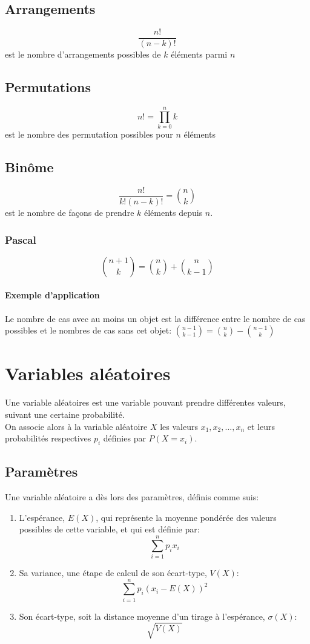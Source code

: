 \documentclass{article}
\begin{document}
\subsection{Arrangements}
$$\frac{n!}{(n-k)!}$$ est le nombre d'arrangements possibles de $k$ éléments parmi $n$

\subsection{Permutations}
$$n!=\prod_{k=0}^nk$$ est le nombre des permutation possibles pour $n$ éléments

\subsection{Binôme}
$$\frac{n!}{k!(n - k)!} = \binom{n}{k}$$ est le nombre de façons de prendre $k$ éléments depuis $n$.
\subsubsection{Pascal}
$$\binom{n+1}{k} = \binom{n}{k} + \binom{n}{k-1}$$
\break
\paragraph{Exemple d'application}
Le nombre de cas avec au moins un objet est la différence entre le nombre de cas possibles et le nombres de cas sans cet objet: $\binom{n-1}{k-1} = \binom{n}{k} - \binom{n-1}{k}$



\section{Variables aléatoires}

Une variable aléatoires est une variable pouvant prendre différentes valeurs, suivant une certaine probabilité. \\
On associe alors à la variable aléatoire $X$ les valeurs $x_1, x_2, ..., x_n$ et leurs probabilités respectives $p_i$ définies par $P(X = x_i)$.


\subsection{Paramètres}
Une variable aléatoire a dès lors des paramètres, définis comme suis:
\begin{enumerate}
	\item L'espérance, $E(X)$, qui représente la moyenne pondérée des valeurs possibles de cette variable, et qui est définie par: $$\sum^n_{i=1}p_ix_i$$
	\item Sa variance, une étape de calcul de son écart-type, $V(X)$: $$\sum^n_{i=1}p_i(x_i-E(X))^2$$
	\item Son écart-type, soit la distance moyenne d'un tirage à l'espérance, $\sigma(X)$: $$\sqrt{V(X)}$$
\end{enumerate}
\end{document}
